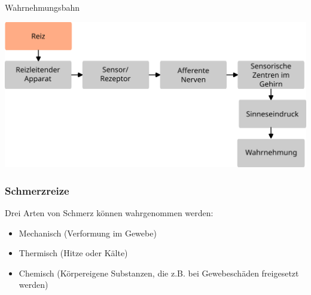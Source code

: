 \documentclass{beamer}
\begin{document}
\begin{frame}{Wahrnehmungsbahn}
    
    \begin{center}
        \includegraphics[width=\textwidth]{wahrnehmungsprozess_ohne_beispiel_reiz.png}
    \end{center}
    
\end{frame}





\begin{frame}
\frametitle{Schmerzreize}

Drei Arten von Schmerz können wahrgenommen werden:

\begin{itemize}
\item
Mechanisch (Verformung im Gewebe)
\item
Thermisch (Hitze oder Kälte)
\item
Chemisch (Körpereigene Substanzen, die z.B. bei Gewebeschäden freigesetzt werden)
\end{itemize}
\end{frame}
\end{document}
